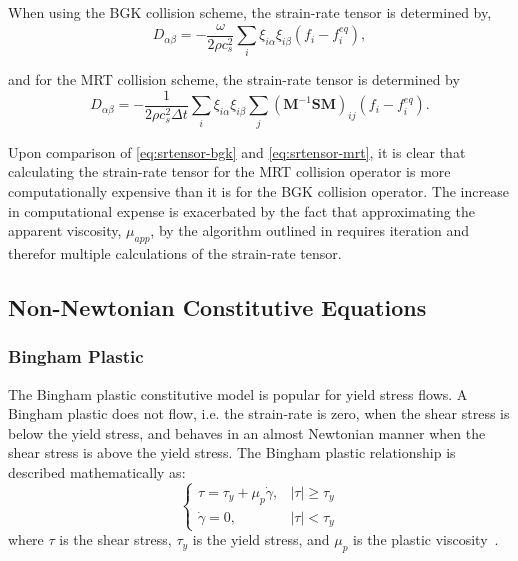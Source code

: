 \documentclass{article}
\newcommand{\transM}{\mathbf{M}}
\newcommand{\relaxM}{\mathbf{S}}
\begin{document}
\noindent When using the BGK collision scheme, the strain-rate tensor is determined by,
\begin{equation} \label{eq:srtensor-bgk}
D_{\alpha \beta} = -\frac{\omega}{2 \rho c_s^2} \sum_i \xi_{i \alpha} \xi_{i \beta} (f_i - f^{eq}_i),
\end{equation} %

\noindent and for the MRT collision scheme, the strain-rate tensor is determined by
\begin{equation} \label{eq:srtensor-mrt}
D_{\alpha \beta} = -\frac{1}{2 \rho c_s^2 \Delta t} \sum_i \xi_{i \alpha} \xi_{i \beta} \sum_j (\transM^{-1} \relaxM \transM)_{ij}(f_i - f^{eq}_i).
\end{equation} %

Upon comparison of \eqref{eq:srtensor-bgk} and \eqref{eq:srtensor-mrt}, it is clear that calculating the strain-rate tensor for the MRT collision operator is more computationally expensive than it is for the BGK collision operator.
The increase in computational expense is exacerbated by the fact that approximating the apparent viscosity, $\mu_{app}$, by the algorithm outlined in  requires iteration and therefor multiple calculations of the strain-rate tensor.

\subsection{Non-Newtonian Constitutive Equations}

\subsubsection{Bingham Plastic}

The Bingham plastic constitutive model is popular for yield stress flows.
A Bingham plastic does not flow, i.e. the strain-rate is zero, when the shear stress is below the yield stress, and behaves in an almost Newtonian manner when the shear stress is above the yield stress.
The Bingham plastic relationship is described mathematically as:
\begin{equation} \label{eq:bingham}
\begin{cases}
\tau = \tau_y + \mu_p \dot{\gamma}, & |\tau| \geq \tau_y \\
\dot{\gamma} = 0, & |\tau| < \tau_y
\end{cases}
\end{equation}
\noindent where $\tau$ is the shear stress, $\tau_y$ is the yield stress, and $\mu_p$ is the plastic viscosity~\cite{bingham1922fluidity}.
\end{document}
